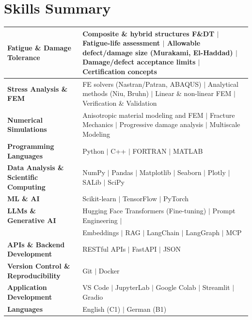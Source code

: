 \documentclass[a4paper,20pt]{article}
\begin{document}
\section{\color{blue}Skills Summary}
\begin{tabular}{|p{8cm}p{10.5cm}|}

\hline
\textbf{Fatigue \& Damage Tolerance} &
Composite \& hybrid structures F\&DT \(\vert\) Fatigue-life assessment \(\vert\) Allowable defect/damage size (Murakami, El-Haddad) \(\vert\) Damage/defect acceptance limits \(\vert\) Certification concepts \\

\hline
\textbf{Stress Analysis \& FEM} &
FE solvers (Nastran/Patran, ABAQUS) \(\vert\) Analytical methods (Niu, Bruhn) \(\vert\) Linear \& non-linear FEM \(\vert\) Verification \& Validation \\

\hline
\textbf{Numerical Simulations} &
Anisotropic material modeling and FEM  \(\vert\) Fracture Mechanics  \(\vert\) Progressive damage analysis \(\vert\) Multiscale Modeling \\

\hline
\textbf{ Programming Languages} &
Python  \(\vert\) C++ \(\vert\) FORTRAN \(\vert\) MATLAB \\
\hline

\textbf{ Data Analysis \& Scientific Computing} &
NumPy \(\vert\) Pandas \(\vert\) Matplotlib \(\vert\) Seaborn \(\vert\) Plotly \(\vert\) SALib \(\vert\) SciPy \\
\hline

\textbf{ ML \& AI} &
Scikit-learn \(\vert\) TensorFlow \(\vert\) PyTorch \\
\hline

\textbf{LLMs \& Generative AI} &
Hugging Face Transformers (Fine-tuning) \(\vert\) Prompt Engineering \(\vert\) \\ & Embeddings \(\vert\) RAG \(\vert\) LangChain \(\vert\) LangGraph \(\vert\) MCP \\

\hline

\textbf{ APIs \& Backend Development} &
RESTful APIs \(\vert\) FastAPI \(\vert\) JSON\\
\hline


\textbf{ Version Control \& Reproducibility} &
Git \(\vert\) Docker \\
\hline

\textbf{ Application Development} &
VS Code \(\vert\) JupyterLab \(\vert\) Google Colab \(\vert\) Streamlit \(\vert\) Gradio\\
\hline
\textbf{ Languages} &
English (C1) \(\vert\) German (B1) \\
\hline
\end{tabular}
\end{document}
